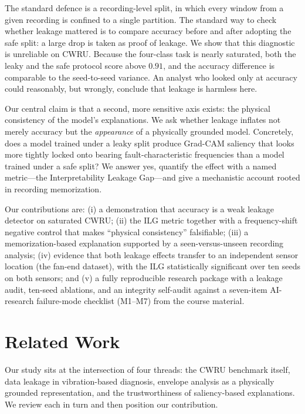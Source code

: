 \documentclass[11pt]{article}
\begin{document}
The standard defence is a recording-level split, in which every window from a given
recording is confined to a single partition. The standard way to check whether leakage
mattered is to compare accuracy before and after adopting the safe split: a large drop is
taken as proof of leakage. We show that this diagnostic is unreliable on CWRU. Because the
four-class task is nearly saturated, both the leaky and the safe protocol score above
$0.91$, and the accuracy difference is comparable to the seed-to-seed variance. An analyst
who looked only at accuracy could reasonably, but wrongly, conclude that leakage is
harmless here.

Our central claim is that a second, more sensitive axis exists: the physical consistency
of the model's explanations. We ask whether leakage inflates not merely accuracy but the
\emph{appearance} of a physically grounded model. Concretely, does a model trained under a
leaky split produce Grad-CAM saliency that looks more tightly locked onto bearing
fault-characteristic frequencies than a model trained under a safe split? We answer yes,
quantify the effect with a named metric---the Interpretability Leakage Gap---and give a
mechanistic account rooted in recording memorization.

Our contributions are: (i) a demonstration that accuracy is a weak leakage detector on
saturated CWRU; (ii) the ILG metric together with a frequency-shift negative control that
makes ``physical consistency'' falsifiable; (iii) a memorization-based explanation
supported by a seen-versus-unseen recording analysis; (iv) evidence that both leakage
effects transfer to an independent sensor location (the fan-end dataset), with the ILG
statistically significant over ten seeds on both sensors; and (v) a fully reproducible
research package with a leakage audit, ten-seed ablations, and an integrity self-audit
against a seven-item AI-research failure-mode checklist (M1--M7) from the course material.

\section{Related Work}
Our study sits at the intersection of four threads: the CWRU benchmark itself, data
leakage in vibration-based diagnosis, envelope analysis as a physically grounded
representation, and the trustworthiness of saliency-based explanations. We review each in
turn and then position our contribution.
\end{document}
